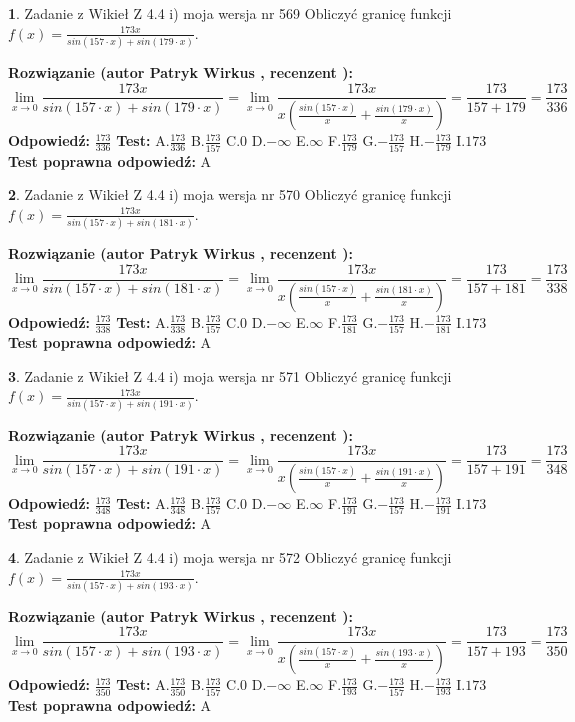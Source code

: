 \documentclass[12pt, a4paper]{article}
\theoremstyle{definition} %
\newtheorem{zad}{}
\newcommand{\zadStart}[1]{\begin{zad}#1\newline}
\newcommand{\zadStop}{\end{zad}}
\newcommand{\rozwStart}[2]{\noindent \textbf{Rozwiązanie (autor #1 , recenzent #2): }\newline}
\newcommand{\rozwStop}{\newline}
\newcommand{\odpStart}{\noindent \textbf{Odpowiedź:}\newline}
\newcommand{\odpStop}{\newline}
\newcommand{\testStart}{\noindent \textbf{Test:}\newline}
\newcommand{\testStop}{\newline}
\newcommand{\kluczStart}{\noindent \textbf{Test poprawna odpowiedź:}\newline}
\newcommand{\kluczStop}{\newline}
\begin{document}
\zadStart{Zadanie z Wikieł Z 4.4 i) moja wersja nr 569}
Obliczyć granicę funkcji $f(x)=\frac{173x}{sin(157\cdot x) +sin(179\cdot x)}$.
\zadStop
\rozwStart{Patryk Wirkus}{}
$$\lim\limits_{x\to 0}\frac{173x}{sin(157\cdot x) +sin(179\cdot x)}=\lim\limits_{x\to 0}\frac{173x}{x(\frac{sin(157\cdot x)}{x}+\frac{sin(179\cdot x)}{x})}=\frac{173}{157+179} = \frac{173}{336}$$
\rozwStop
\odpStart
$\frac{173}{336}$
\odpStop
\testStart
A.$\frac{173}{336}$
B.$\frac{173}{157}$
C.$0$
D.$-\infty$
E.$\infty$
F.$\frac{173}{179}$
G.$-\frac{173}{157}$
H.$-\frac{173}{179}$
I.$173$
\testStop
\kluczStart
A
\kluczStop



\zadStart{Zadanie z Wikieł Z 4.4 i) moja wersja nr 570}
Obliczyć granicę funkcji $f(x)=\frac{173x}{sin(157\cdot x) +sin(181\cdot x)}$.
\zadStop
\rozwStart{Patryk Wirkus}{}
$$\lim\limits_{x\to 0}\frac{173x}{sin(157\cdot x) +sin(181\cdot x)}=\lim\limits_{x\to 0}\frac{173x}{x(\frac{sin(157\cdot x)}{x}+\frac{sin(181\cdot x)}{x})}=\frac{173}{157+181} = \frac{173}{338}$$
\rozwStop
\odpStart
$\frac{173}{338}$
\odpStop
\testStart
A.$\frac{173}{338}$
B.$\frac{173}{157}$
C.$0$
D.$-\infty$
E.$\infty$
F.$\frac{173}{181}$
G.$-\frac{173}{157}$
H.$-\frac{173}{181}$
I.$173$
\testStop
\kluczStart
A
\kluczStop



\zadStart{Zadanie z Wikieł Z 4.4 i) moja wersja nr 571}
Obliczyć granicę funkcji $f(x)=\frac{173x}{sin(157\cdot x) +sin(191\cdot x)}$.
\zadStop
\rozwStart{Patryk Wirkus}{}
$$\lim\limits_{x\to 0}\frac{173x}{sin(157\cdot x) +sin(191\cdot x)}=\lim\limits_{x\to 0}\frac{173x}{x(\frac{sin(157\cdot x)}{x}+\frac{sin(191\cdot x)}{x})}=\frac{173}{157+191} = \frac{173}{348}$$
\rozwStop
\odpStart
$\frac{173}{348}$
\odpStop
\testStart
A.$\frac{173}{348}$
B.$\frac{173}{157}$
C.$0$
D.$-\infty$
E.$\infty$
F.$\frac{173}{191}$
G.$-\frac{173}{157}$
H.$-\frac{173}{191}$
I.$173$
\testStop
\kluczStart
A
\kluczStop



\zadStart{Zadanie z Wikieł Z 4.4 i) moja wersja nr 572}
Obliczyć granicę funkcji $f(x)=\frac{173x}{sin(157\cdot x) +sin(193\cdot x)}$.
\zadStop
\rozwStart{Patryk Wirkus}{}
$$\lim\limits_{x\to 0}\frac{173x}{sin(157\cdot x) +sin(193\cdot x)}=\lim\limits_{x\to 0}\frac{173x}{x(\frac{sin(157\cdot x)}{x}+\frac{sin(193\cdot x)}{x})}=\frac{173}{157+193} = \frac{173}{350}$$
\rozwStop
\odpStart
$\frac{173}{350}$
\odpStop
\testStart
A.$\frac{173}{350}$
B.$\frac{173}{157}$
C.$0$
D.$-\infty$
E.$\infty$
F.$\frac{173}{193}$
G.$-\frac{173}{157}$
H.$-\frac{173}{193}$
I.$173$
\testStop
\kluczStart
A
\kluczStop
\end{document}
